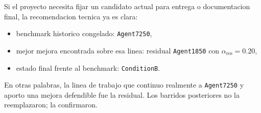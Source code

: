 \documentclass[11pt,a4paper]{article}
\begin{document}
Si el proyecto necesita fijar un candidato actual para entrega o documentacion final, la recomendacion tecnica ya es clara:

\begin{itemize}[leftmargin=1.6em]
\item benchmark historico congelado: \texttt{Agent7250},
\item mejor mejora encontrada sobre esa linea: residual \texttt{Agent1850} con \(\alpha_{\mathrm{res}} = 0.20\),
\item estado final frente al benchmark: \texttt{ConditionB}.
\end{itemize}

En otras palabras, la linea de trabajo que continuo realmente a \texttt{Agent7250} y aporto una mejora defendible fue la residual. Los barridos posteriores no la reemplazaron; la confirmaron.



\end{document}
